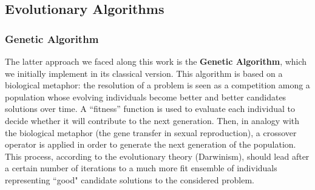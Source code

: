 \documentclass[10pt]{article}
\begin{document}
\subsection{Evolutionary Algorithms}
\subsubsection{Genetic Algorithm}
The latter approach we faced along this work is the \textbf{Genetic Algorithm}, which we initially implement in its classical version.
This algorithm is based on a biological metaphor: the resolution of a problem is seen as a competition among a population whose evolving individuals become better and better candidates solutions over time. 
A “fitness” function is used to evaluate each individual to decide whether it will contribute to the next
generation. 
Then, in analogy with the biological metaphor (the gene transfer in sexual reproduction), a crossover operator is applied in order to generate the next generation of the population.
This process, according to the evolutionary theory (Darwinism), should lead after a certain number of iterations to a much more fit ensemble of individuals representing ``good" candidate solutions to the considered problem.
\end{document}

